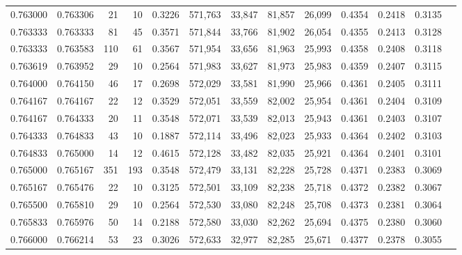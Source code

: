 \begin{tabular}{rrrrrrrrrrrrr}
0.763000 & 0.763306 &    21 &  10 &                                     0.3226 & 571,763 &  33,847 &  81,857 &  26,099 & 0.4354 & 0.2418 & 0.3135 \\
0.763333 & 0.763333 &    81 &  45 &                                     0.3571 & 571,844 &  33,766 &  81,902 &  26,054 & 0.4355 & 0.2413 & 0.3128 \\
0.763333 & 0.763583 &   110 &  61 &                                     0.3567 & 571,954 &  33,656 &  81,963 &  25,993 & 0.4358 & 0.2408 & 0.3118 \\
0.763619 & 0.763952 &    29 &  10 &                                     0.2564 & 571,983 &  33,627 &  81,973 &  25,983 & 0.4359 & 0.2407 & 0.3115 \\
0.764000 & 0.764150 &    46 &  17 &                                     0.2698 & 572,029 &  33,581 &  81,990 &  25,966 & 0.4361 & 0.2405 & 0.3111 \\
0.764167 & 0.764167 &    22 &  12 &                                     0.3529 & 572,051 &  33,559 &  82,002 &  25,954 & 0.4361 & 0.2404 & 0.3109 \\
0.764167 & 0.764333 &    20 &  11 &                                     0.3548 & 572,071 &  33,539 &  82,013 &  25,943 & 0.4361 & 0.2403 & 0.3107 \\
0.764333 & 0.764833 &    43 &  10 &                                     0.1887 & 572,114 &  33,496 &  82,023 &  25,933 & 0.4364 & 0.2402 & 0.3103 \\
0.764833 & 0.765000 &    14 &  12 &                                     0.4615 & 572,128 &  33,482 &  82,035 &  25,921 & 0.4364 & 0.2401 & 0.3101 \\
0.765000 & 0.765167 &   351 & 193 &                                     0.3548 & 572,479 &  33,131 &  82,228 &  25,728 & 0.4371 & 0.2383 & 0.3069 \\
0.765167 & 0.765476 &    22 &  10 &                                     0.3125 & 572,501 &  33,109 &  82,238 &  25,718 & 0.4372 & 0.2382 & 0.3067 \\
0.765500 & 0.765810 &    29 &  10 &                                     0.2564 & 572,530 &  33,080 &  82,248 &  25,708 & 0.4373 & 0.2381 & 0.3064 \\
0.765833 & 0.765976 &    50 &  14 &                                     0.2188 & 572,580 &  33,030 &  82,262 &  25,694 & 0.4375 & 0.2380 & 0.3060 \\
0.766000 & 0.766214 &    53 &  23 &                                     0.3026 & 572,633 &  32,977 &  82,285 &  25,671 & 0.4377 & 0.2378 & 0.3055 \\

\end{tabular}
